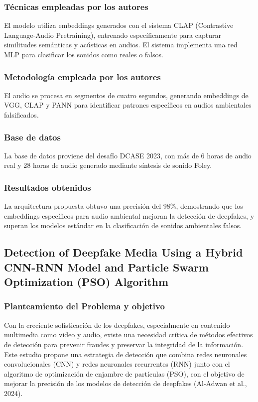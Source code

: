 \subsubsection{Técnicas empleadas por los autores}
El modelo utiliza embeddings generados con el sistema CLAP (Contrastive Language-Audio Pretraining), entrenado específicamente para capturar similitudes semánticas y acústicas en audios. El sistema implementa una red MLP para clasificar los sonidos como reales o falsos.

\subsubsection{Metodología empleada por los autores}
El audio se procesa en segmentos de cuatro segundos, generando embeddings de VGG, CLAP y PANN para identificar patrones específicos en audios ambientales falsificados.

\subsubsection{Base de datos}
La base de datos proviene del desafío DCASE 2023, con más de 6 horas de audio real y 28 horas de audio generado mediante síntesis de sonido Foley.

\subsubsection{Resultados obtenidos}
La arquitectura propuesta obtuvo una precisión del 98\%, demostrando que los embeddings específicos para audio ambiental mejoran la detección de deepfakes, y superan los modelos estándar en la clasificación de sonidos ambientales falsos.

\subsection{Detection of Deepfake Media Using a Hybrid CNN-RNN Model and Particle Swarm Optimization (PSO) Algorithm \citep*{al_adwan2024cnn_rnn_pso}}

\subsubsection{Planteamiento del Problema y objetivo }
Con la creciente sofisticación de los deepfakes, especialmente en contenido multimedia como video y audio, existe una necesidad crítica de métodos efectivos de detección para prevenir fraudes y preservar la integridad de la información. Este estudio propone una estrategia de detección que combina redes neuronales convolucionales (CNN) y redes neuronales recurrentes (RNN) junto con el algoritmo de optimización de enjambre de partículas (PSO), con el objetivo de mejorar la precisión de los modelos de detección de deepfakes (Al-Adwan et al., 2024).

